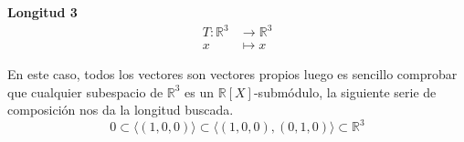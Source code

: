 \textbf{Longitud 3}%
\[
\begin{aligned}
  T:\mathbb{R}^3 &\rightarrow \mathbb{R}^3\\
  x &\mapsto x
\end{aligned}
\]

En este caso, todos los vectores son vectores propios luego es sencillo comprobar que cualquier subespacio de \(\mathbb{R}^3\) es un
\(\mathbb{R}[X]\)-submódulo, la siguiente serie de composición nos da la longitud buscada.
\[
        0 \subset \langle (1,0,0) \rangle \subset \langle (1,0,0), (0,1,0)
        \rangle \subset \mathbb{R}^3
\]
